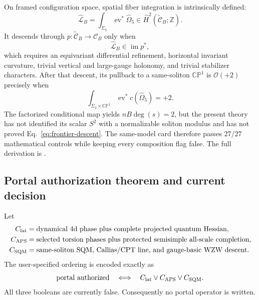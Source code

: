 \documentclass[11pt]{article}
\numberwithin{equation}{section}
\begin{document}
On framed configuration space, spatial fiber integration is intrinsically
defined:
\begin{equation}
 \widehat{\mathcal L}_B
 =\int_{\Sigma_3}\operatorname{ev}^*\widehat\Omega_5
 \in\widehat H^2(\widetilde{\mathcal C}_B;\mathbb Z).
 \label{eq:frontier-transgression}
\end{equation}
It descends through
\(p:\widetilde{\mathcal C}_B\to\mathcal C_B\) only when
\begin{equation}
 \widehat{\mathcal L}_B\in\operatorname{im}p^*,
 \label{eq:frontier-descent}
\end{equation}
which requires an equivariant differential refinement, horizontal invariant
curvature, trivial vertical and large-gauge holonomy, and trivial stabilizer
characters.  After that descent, its pullback to a same-soliton
\(\mathbb{CP}^1\) is \(\mathcal O(+2)\) precisely when
\begin{equation}
 \int_{\Sigma_3\times\mathbb{CP}^1}
 \operatorname{ev}^*c(\widehat\Omega_5)=+2.
 \label{eq:frontier-transgression-number}
\end{equation}
The factorized conditional map yields \(nB\deg(s)=2\), but the present
theory has not identified its scalar \(S^2\) with a normalizable soliton
modulus and has not proved Eq.~\eqref{eq:frontier-descent}.  The same-model
card therefore passes \(27/27\) mathematical controls while keeping every
composition flag false.  The full derivation is
.

\subsection{Portal authorization theorem and current decision}

Let
\begin{align}
 C_{\rm lat}&=\text{dynamical 4d phase plus complete projected quantum
 Hessian},\nonumber\\
 C_{\rm APS}&=\text{selected torsion phases plus protected semisimple
 all-scale completion},\nonumber\\
 C_{\rm SQM}&=\text{same-soliton SQM, Callias/CPT line, and gauge-basic
 WZW descent}.
 \label{eq:frontier-route-booleans}
\end{align}
The user-specified ordering is encoded exactly as
\begin{equation}
 {\rm portal\ authorized}
 \quad\Longleftrightarrow\quad
 C_{\rm lat}\lor C_{\rm APS}\lor C_{\rm SQM}.
 \label{eq:frontier-portal-authorization}
\end{equation}
All three booleans are currently false.  Consequently no portal operator is
written.
\end{document}
